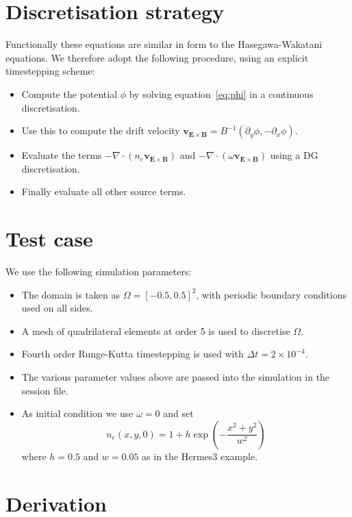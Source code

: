 \documentclass{article}
\begin{document}
\section{Discretisation strategy}

Functionally these equations are similar in form to the Hasegawa-Wakatani
equations. We therefore adopt the following procedure, using an explicit
timestepping scheme:
\begin{itemize}
    \item Compute the potential $\phi$ by solving equation~\eqref{eq:phi} in a
    continuous discretisation.
    \item Use this to compute the drift velocity
    $\bm{v}_{\bm{E} \times \bm{B}} = B^{-1} (\partial_y\phi, -\partial_x\phi)$.
    \item Evaluate the terms $-\nabla\cdot(n_e\bm{v}_{\bm{E} \times \bm{B}})$ and
    $ -\nabla\cdot(\omega\bm{v}_{\bm{E} \times \bm{B}})$ using a DG discretisation.
    \item Finally evaluate all other source terms.
\end{itemize}

\section{Test case}

We use the following simulation parameters:

\begin{itemize}
    \item The domain is taken as $\Omega = [-0.5,0.5]^2$, with periodic boundary
    conditions used on all sides.
    \item A mesh of quadrilateral elements at order 5 is used to discretise
    $\Omega$.
    \item Fourth order Runge-Kutta timestepping is used with
    $\Delta t = 2\times 10^{-4}$.
    \item The various parameter values above are passed into the simulation in the
    session file.
    \item As initial condition we use $\omega = 0$ and set
    \[
    n_e(x,y,0) = 1 + h \exp\left(-\frac{x^2 + y^2}{w^2} \right)
    \]
    where $h = 0.5$ and $w = 0.05$ as in the Hermes3 example.
\end{itemize}

\appendix

\section{Derivation}
\end{document}
